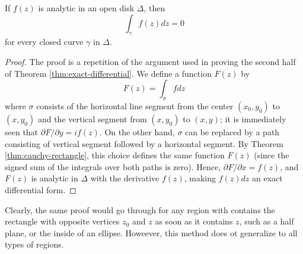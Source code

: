 \begin{theorem}
\label{thm:cauchy-disk}
If $f(z)$ is analytic in an open disk $\Delta$, then $$\int_{\gamma} f(z)dz=0$$ for every closed curve $\gamma$ in $\Delta$.
\end{theorem}
\begin{proof}
The proof is a repetition of the argument used in proving the second half of Theorem \ref{thm:exact-differential}. We define a function $F(z)$ by $$F(z)=\int_{\sigma} f dz$$ where $\sigma$ consists of the horizontal line segment from the center $(x_0,y_0)$ to $(x, y_0)$ and the vertical segment from $(x,y_0)$ to $(x,y)$; it is immediately seen that $\partial F/\partial y=if(z)$. On the other hand, $\sigma$ can be replaced by a path consisting of vertical segment followed by a horizontal segment. By Theorem \ref{thm:cauchy-rectangle}, this choice defines the same function $F(z)$ (since the signed sum of the integrals over both paths is zero). Hence, $\partial F/\partial x=f(z)$, and $F(z)$ is analytic in $\Delta$ with the derivative $f(z)$, making $f(z)dz$ an exact differential form.
\end{proof}

Clearly, the same proof would go through for any region with contains the rectangle with opposite vertices $z_0$ and $z$ as soon as it contains $z$, such as a half plane, or the inside of an ellipse. Howeever, this method does ot generalize to all types of regions.

